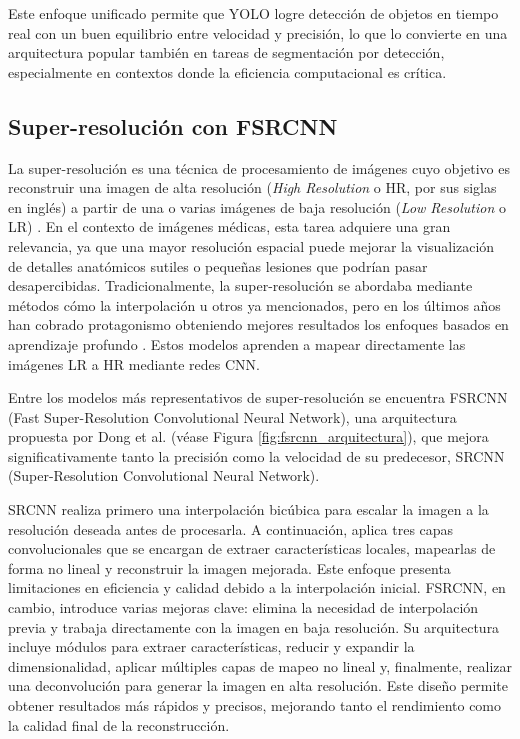 \documentclass[../main.tex]{subfiles}
\begin{document}
Este enfoque unificado permite que YOLO logre detección de objetos en tiempo real con un buen equilibrio entre velocidad y precisión, lo que lo convierte en una arquitectura popular también en tareas de segmentación por detección, especialmente en contextos donde la eficiencia computacional es crítica.

\subsection{Super-resolución con FSRCNN}
La super-resolución es una técnica de procesamiento de imágenes cuyo objetivo es reconstruir una imagen de alta resolución (\textit{High Resolution} o HR, por sus siglas en inglés) a partir de una o varias imágenes de baja resolución (\textit{Low Resolution} o LR) \cite{sr_systematic_r}. En el contexto de imágenes médicas, esta tarea adquiere una gran relevancia, ya que una mayor resolución espacial puede mejorar la visualización de detalles anatómicos sutiles o pequeñas lesiones que podrían pasar desapercibidas. Tradicionalmente, la super-resolución se abordaba mediante métodos cómo la interpolación u otros ya mencionados, pero en los últimos años han cobrado protagonismo obteniendo mejores resultados los enfoques basados en aprendizaje profundo \cite{ANWAR_SR}. Estos modelos aprenden a mapear directamente las imágenes LR a HR mediante redes CNN.

Entre los modelos más representativos de super-resolución se encuentra FSRCNN (Fast Super-Resolution Convolutional Neural Network), una arquitectura propuesta por Dong et al.\cite{dong2016} (véase Figura \ref{fig:fsrcnn_arquitectura}), que mejora significativamente tanto la precisión como la velocidad de su predecesor, SRCNN (Super-Resolution 
Convolutional Neural Network). 

SRCNN realiza primero una interpolación bicúbica para escalar la imagen a la resolución deseada antes de procesarla. A continuación, aplica tres capas convolucionales que se encargan de extraer características locales, mapearlas de forma no lineal y reconstruir la imagen mejorada. Este enfoque presenta limitaciones en eficiencia y calidad debido a la interpolación inicial. FSRCNN, en cambio, introduce varias mejoras clave: elimina la necesidad de interpolación previa y trabaja directamente con la imagen en baja resolución. Su arquitectura incluye módulos para extraer características, reducir y expandir la dimensionalidad, aplicar múltiples capas de mapeo no lineal y, finalmente, realizar una deconvolución para generar la imagen en alta resolución. Este diseño permite obtener resultados más rápidos y precisos, mejorando tanto el rendimiento como la calidad final de la reconstrucción.
\end{document}
